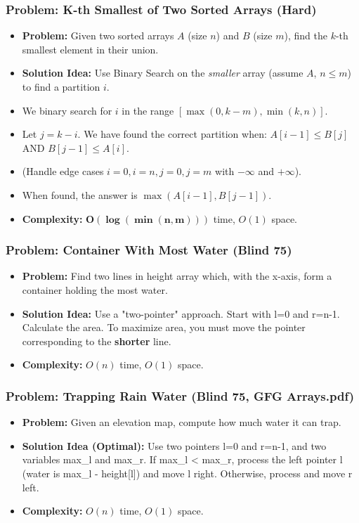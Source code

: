 \subsubsection{Problem: K-th Smallest of Two Sorted Arrays (Hard)}
\begin{itemize}
\item \textbf{Problem:} Given two sorted arrays $A$ (size $n$) and $B$ (size $m$), find the $k$-th smallest element in their union.
\item \textbf{Solution Idea:} Use Binary Search on the \textit{smaller} array (assume $A$, $n \le m$) to find a partition $i$.
\item We binary search for $i$ in the range $[\max(0, k-m), \min(k, n)]$.
\item Let $j = k - i$. We have found the correct partition when:
$A[i-1] \le B[j]$ AND $B[j-1] \le A[i]$.
\item (Handle edge cases $i=0, i=n, j=0, j=m$ with $-\infty$ and $+\infty$).
\item When found, the answer is $\max(A[i-1], B[j-1])$.
\item \textbf{Complexity:} $\mathbf{O(\log(\min(n, m)))}$ time, $O(1)$ space.
\end{itemize}

\subsubsection{Problem: Container With Most Water (Blind 75)}
\begin{itemize}
\item \textbf{Problem:} Find two lines in height array which, with the x-axis, form a container holding the most water.
\item \textbf{Solution Idea:} Use a "two-pointer" approach. Start with l=0 and r=n-1. Calculate the area. To maximize area, you must move the pointer corresponding to the \textbf{shorter} line.
\item \textbf{Complexity:} $O(n)$ time, $O(1)$ space.
\end{itemize}

\subsubsection{Problem: Trapping Rain Water (Blind 75, GFG Arrays.pdf)}
\begin{itemize}
\item \textbf{Problem:} Given an elevation map, compute how much water it can trap.
\item \textbf{Solution Idea (Optimal):} Use two pointers l=0 and r=n-1, and two variables max\_l and max\_r. If max\_l < max\_r, process the left pointer l (water is max\_l - height[l]) and move l right. Otherwise, process and move r left.
\item \textbf{Complexity:} $O(n)$ time, $O(1)$ space.
\end{itemize}

